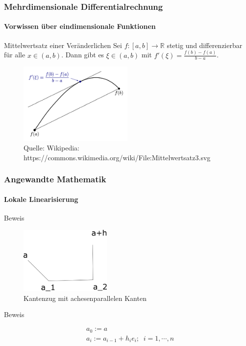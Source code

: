 \documentclass{beamer}
\begin{document}
\begin{frame}
    \frametitle{Mehrdimensionale Differentialrechnung}
\framesubtitle{Vorwissen über eindimensionale  Funktionen}
    \begin{block}{Mittelwertsatz einer Veränderlichen}
Sei $f : [a,b] \to \mathbb{R}$ stetig und differenzierbar für alle $x \in (a,b)$. Dann gibt es $\xi \in (a,b)$ mit
$f'(\xi) = \frac{f(b) - f(a)} { b-a}$.
\end{block}
\begin{figure}[H]
      \centering
    \includegraphics[width=0.5\textwidth]{images/Mittelwertsatz3.png}
      \caption{Quelle: Wikipedia: https://commons.wikimedia.org/wiki/File:Mittelwertsatz3.svg}
\end{figure}
 \end{frame}



\begin{frame}
    \frametitle{Angewandte Mathematik}
\framesubtitle{Lokale Linearisierung}
    \begin{block}{Beweis}
\begin{figure}[H]
      \centering
    \includegraphics[width=0.4\textwidth]{images/kantenzug}
      \caption{Kantenzug mit achesenparallelen Kanten}
\end{figure}

\end{block}
    \begin{block}{Beweis}

\begin{align*}
& a_0 := a \\
& a_i  := a_{i-1} + h_i e_i;  \;  \;  i = 1, \cdots , n
\end{align*} 
\end{block}

 \end{frame}
\end{document}
